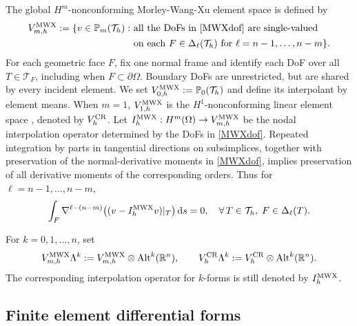 \documentclass[10pt]{amsart}
\numberwithin{equation}{section}
\newcommand{\dd}{\,{\rm d}}
\begin{document}
The global $H^m$-nonconforming Morley-Wang-Xu element space is defined by
\begin{align*}
V_{m,h}^{\rm MWX}:=\{v\in \mathbb P_m(\mathcal T_h):& \textrm{ all the DoFs in \eqref{MWXdof} are single-valued } \\*
& \textrm{ on each } F\in\Delta_{\ell}(\mathcal T_h) \textrm{ for } \ell=n-1,\ldots, n-m\}.
\end{align*}
For each geometric face $F$, fix one normal frame and identify each DoF over all $T\in\mathcal T_F$, including when $F\subset\partial\Omega$.
Boundary DoFs are unrestricted, but are shared by every incident element.
We set $V_{0,h}^{\rm MWX}:=\mathbb P_0(\mathcal T_h)$ and define its interpolant by element means.
When $m=1$, $V_{1,h}^{\rm MWX}$ is the $H^1$-nonconforming linear element space \cite{CrouzeixRaviart1973}, denoted by $V_{h}^{\rm CR}$.
Let $I_{h}^{\rm MWX}: H^m(\Omega) \to V_{m,h}^{\rm MWX}$ be the nodal interpolation operator determined by the DoFs in \eqref{MWXdof}.
Repeated integration by parts in tangential directions on subsimplices,
together with preservation of the normal-derivative moments in
\eqref{MWXdof}, implies preservation of all derivative moments of the
corresponding orders. Thus for $\ell=n-1,\ldots,n-m$,
\begin{equation}\label{eq:nablajIhMWX}
\int_F\nabla^{\ell-(n-m)}\bigl((v-I_{h}^{\rm MWX}v)|_T\bigr)\dd s=0,\quad
\forall\,T\in\mathcal T_h,\; F\in\Delta_\ell(T).
\end{equation}

For \(k=0,1,\ldots,n\), set
\[
V_{m,h}^{\rm MWX}\Lambda^k
:= V_{m,h}^{\rm MWX}\otimes {\rm Alt}^k(\mathbb R^n),
\qquad
V_h^{\rm CR}\Lambda^k
:= V_h^{\rm CR}\otimes {\rm Alt}^k(\mathbb R^n).
\]
The corresponding interpolation operator for \(k\)-forms is still denoted by
\(I_h^{\rm MWX}\).

\subsection{Finite element differential forms}
\end{document}
